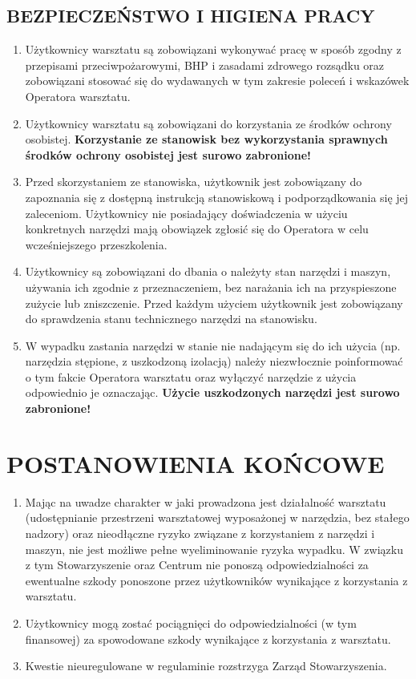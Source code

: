 \documentclass{article}
\begin{document}
\subsection{BEZPIECZEŃSTWO I HIGIENA PRACY}
    \begin{enumerate}
    \item Użytkownicy warsztatu są zobowiązani wykonywać pracę w sposób zgodny z przepisami przeciwpożarowymi, BHP i zasadami zdrowego rozsądku oraz zobowiązani stosować się do wydawanych w tym zakresie poleceń i wskazówek Operatora warsztatu.
    \item Użytkownicy warsztatu są zobowiązani do korzystania ze środków ochrony osobistej. \textbf{Korzystanie ze stanowisk bez wykorzystania sprawnych środków ochrony osobistej jest surowo zabronione!}
    \item Przed skorzystaniem ze stanowiska, użytkownik jest zobowiązany do zapoznania się z dostępną instrukcją stanowiskową i podporządkowania się jej zaleceniom. Użytkownicy nie posiadający doświadczenia w użyciu konkretnych narzędzi mają obowiązek zgłosić się do Operatora w celu wcześniejszego przeszkolenia.
    \item Użytkownicy są zobowiązani do dbania o należyty stan narzędzi i maszyn, używania ich zgodnie z przeznaczeniem, bez narażania ich na przyspieszone zużycie lub zniszczenie. Przed każdym użyciem użytkownik jest zobowiązany do sprawdzenia stanu technicznego narzędzi na stanowisku.
    \item W wypadku zastania narzędzi w stanie nie nadającym się do ich użycia (np. narzędzia stępione, z uszkodzoną izolacją) należy niezwłocznie poinformować o tym fakcie Operatora warsztatu oraz wyłączyć narzędzie z użycia odpowiednio je oznaczając. \textbf{Użycie uszkodzonych narzędzi jest surowo zabronione!}
    \end{enumerate}		
\section{POSTANOWIENIA KOŃCOWE}
    \begin{enumerate}
    \item Mając na uwadze charakter w jaki prowadzona jest działalność warsztatu (udostępnianie przestrzeni warsztatowej wyposażonej w narzędzia, bez stałego nadzory) oraz nieodłączne ryzyko związane z korzystaniem z narzędzi i maszyn, nie jest możliwe pełne wyeliminowanie ryzyka wypadku. W związku z tym Stowarzyszenie oraz Centrum nie ponoszą odpowiedzialności za ewentualne szkody ponoszone przez użytkowników wynikające z korzystania z warsztatu.
    \item Użytkownicy mogą zostać pociągnięci do odpowiedzialności (w tym finansowej) za spowodowane szkody wynikające z korzystania z warsztatu.
    \item Kwestie nieuregulowane w regulaminie rozstrzyga Zarząd Stowarzyszenia.
    \end{enumerate}
\end{document}
